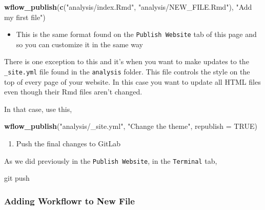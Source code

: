 \documentclass[]{book}
\newenvironment{Shaded}{\begin{snugshade}}{\end{snugshade}}
\newcommand{\DataTypeTok}[1]{\textcolor[rgb]{0.13,0.29,0.53}{#1}}
\newcommand{\KeywordTok}[1]{\textcolor[rgb]{0.13,0.29,0.53}{\textbf{#1}}}
\newcommand{\NormalTok}[1]{#1}
\newcommand{\OtherTok}[1]{\textcolor[rgb]{0.56,0.35,0.01}{#1}}
\newcommand{\StringTok}[1]{\textcolor[rgb]{0.31,0.60,0.02}{#1}}
\providecommand{\tightlist}{%
  \setlength{\itemsep}{0pt}\setlength{\parskip}{0pt}}
\begin{document}
\begin{Shaded}
\begin{Highlighting}[]
\KeywordTok{wflow_publish}\NormalTok{(}\KeywordTok{c}\NormalTok{(}\StringTok{"analysis/index.Rmd"}\NormalTok{, }\StringTok{"analysis/NEW_FILE.Rmd"}\NormalTok{), }\StringTok{"Add my first file"}\NormalTok{)}
\end{Highlighting}
\end{Shaded}

\begin{itemize}
\tightlist
\item
  This is the same format found on the \texttt{Publish\ Website} tab of this page and so you can customize it in the same way
\end{itemize}

There is one exception to this and it's when you want to make updates to the \texttt{\_site.yml} file found in the \texttt{analysis} folder. This file controls the style on the top of every page of your website. In this case you want to update all HTML files even though their Rmd files aren't changed.

In that case, use this,

\begin{Shaded}
\begin{Highlighting}[]
\KeywordTok{wflow_publish}\NormalTok{(}\StringTok{"analysis/_site.yml"}\NormalTok{, }\StringTok{"Change the theme"}\NormalTok{, }\DataTypeTok{republish =} \OtherTok{TRUE}\NormalTok{)}
\end{Highlighting}
\end{Shaded}

\begin{enumerate}
\def\labelenumi{\arabic{enumi}.}
\setcounter{enumi}{2}
\tightlist
\item
  Push the final changes to GitLab
\end{enumerate}

As we did previously in the \texttt{Publish\ Website}, in the \texttt{Terminal} tab,

\begin{Shaded}
\begin{Highlighting}[]
\NormalTok{git push}
\end{Highlighting}
\end{Shaded}

\hypertarget{adding-workflowr-to-new-file}{%
\subsubsection{Adding Workflowr to New File}\label{adding-workflowr-to-new-file}}
\end{document}
